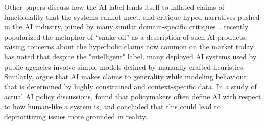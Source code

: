 \documentclass[acmconf,manuscript,screen,natbib=true]{acmart}
\begin{document}
Other papers discuss how the AI label lends itself to inflated claims of functionality that the systems cannot meet. \citet{fake_ai} and \citet{broussard2018artificial} critique hyped narratives pushed in the AI industry, joined by many similar domain-specific critiques~\cite{tennant2021attachments,bender2021dangers,stark_and_hutson,sloane2022silicon,raghavan2020mitigating,bender2020climbing}. 
\citet{narayanan2019recognize} recently popularized the metaphor of ``snake oil'' as a description of such AI products, raising concerns about the hyperbolic claims now common on the market today.
\citet{richardson2021defining} has noted that despite the "intelligent" label, many deployed AI systems used by public agencies involve simple models defined by manually crafted heuristics. Similarly, \citet{grover} argue that AI makes claims to generality while modeling behaviour that is determined by highly constrained and context-specific data. In a study of actual AI policy discussions, \citet{krafft_et_al} found that policymakers often define AI with respect to how human-like a system is, and concluded that this could lead to deprioritizing issues more grounded in reality. %


\end{document}

